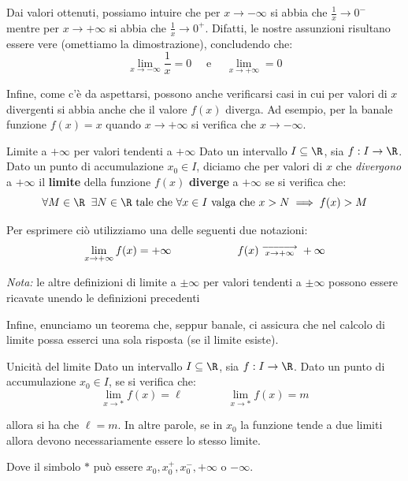 \documentclass[a4paper, 12pt]{report}
\begin{document}
    Dai valori ottenuti, possiamo intuire che per $x \to -\infty$ si abbia che $\frac{1}{x} \to 0^-$ mentre per $x \to +\infty$ si abbia che $\frac{1}{x} \to 0^+$. Difatti, le nostre assunzioni risultano essere vere (omettiamo la dimostrazione), concludendo che:
    \[\lim_{x \to -\infty} \frac{1}{x} = 0 \quad \text{ e } \quad \lim_{x \to +\infty} = 0\]

    Infine, come c'è da aspettarsi, possono anche verificarsi casi in cui per valori di $x$ divergenti si abbia anche che il valore $f(x)$ diverga. Ad esempio, per la banale funzione $f(x) = x$ quando $x \to +\infty$ si verifica che $x \to -\infty$.

    \begin{frameddefn}{Limite a $+\infty$ per valori tendenti a $+\infty$}
        Dato un intervallo $I \subseteq \R$, sia $f : I \to \R$. Dato un punto di accumulazione $x_0 \in I$, diciamo che per valori di $x$ che \textit{divergono} a $+\infty$ il \textbf{limite} della funzione $f(x)$ \textbf{diverge} a $+\infty$ se si verifica che:
        \[\forall M \in \R \;\; \exists N \in \R \text{ tale che } \forall x \in I \text{ valga che } x > N \implies f(x) > M\]

        Per esprimere ciò utilizziamo una delle seguenti due notazioni:
        \[\lim_{x \to +\infty} f(x) = +\infty \qquad\qquad\qquad f(x) \; \substack{\DOTSB\relbar\joinrel\relbar\joinrel\relbar\joinrel\relbar\joinrel\relbar\joinrel\rightarrow \\ x \to +\infty} \; +\infty\]
    \end{frameddefn}

    \textit{Nota:} le altre definizioni di limite a $\pm\infty$ per valori tendenti a $\pm \infty$ possono essere ricavate unendo le definizioni precedenti 

    \newpage

    Infine, enunciamo un teorema che, seppur banale, ci assicura che nel calcolo di limite possa esserci una sola risposta (se il limite esiste).

    \begin{framedthm}[label={unique_lim}]{Unicità del limite}
        Dato un intervallo $I \subseteq \R$, sia $f : I \to \R$. Dato un punto di accumulazione $x_0 \in I$, se si verifica che:
        \[\lim_{x \to *} f(x) = \ell \qquad\qquad \lim_{x \to *} f(x) = m\]

        allora si ha che $\ell = m$. In altre parole, se in $x_0$ la funzione tende a due limiti allora devono necessariamente essere lo stesso limite.
        
        Dove il simbolo $*$ può essere $x_0, x_0^+, x_0^-, +\infty$ o $-\infty$.
    \end{framedthm}
\end{document}
